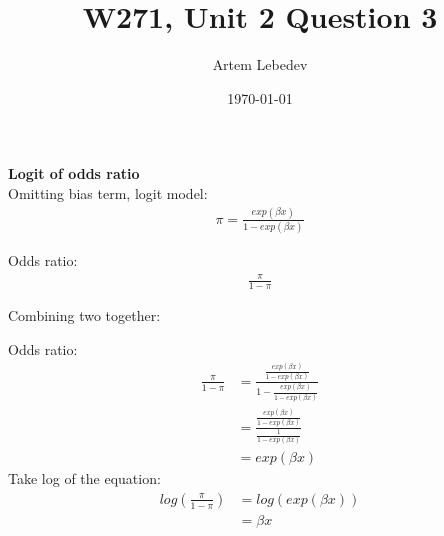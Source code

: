 \documentclass{article}
\author{Artem Lebedev}
\title{W271, Unit 2 Question 3}
\date{\today}
\begin{document}
	
\maketitle


\large \textbf{Logit of odds ratio}\\
Omitting bias term, logit model: 
\begin{align*}
\pi =    \frac{exp(\beta x)}{1- exp(\beta x)}
\end{align*}

Odds ratio: 
\begin{align*}
	\frac{\pi}{1- \pi}
\end{align*}

Combining two together:

Odds ratio: 
\begin{align*}
	\frac{\pi}{1- \pi} &=  \frac{\frac{exp(\beta x)}{1- exp(\beta x)}}{1-\frac{exp(\beta x)}{1- exp(\beta x)}}\\
	& = \frac{\frac{exp(\beta x)}{1- exp(\beta x)}}{\frac{1}{1- exp(\beta x)}}\\
	& = exp(\beta x)
\end{align*}
Take log of the equation: 
\begin{align*}
	log(\frac{\pi}{1- \pi}) & = log(exp(\beta x))\\
	& = \beta x
\end{align*}
\end{document}
